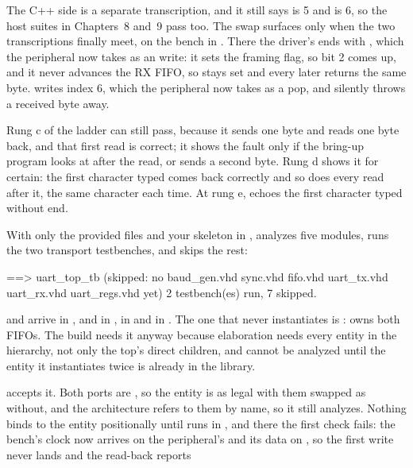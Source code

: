 The C++ side is a separate transcription, and it still says  is 5 and
 is 6, so the host suites in Chapters~8 and~9 pass too. The swap surfaces only
when the two transcriptions finally meet, on the bench in . There the driver's
 ends with , which the peripheral now takes as an
 write: it sets the framing flag, so  bit 2 comes up, and it never
advances the RX FIFO, so  stays set and every later  returns the same
byte.  writes index 6, which the peripheral now takes as a pop, and silently
throws a received byte away.

Rung c of the ladder can still pass, because it sends one byte and reads one byte back, and that
first read is correct; it shows the fault only if the bring-up program looks at  after
the read, or sends a second byte. Rung d shows it for certain: the first character typed comes back
correctly and so does every read after it, the same character each time. At rung e,
 echoes the first character typed without end.

 With only the provided files and your skeleton in ,  analyzes
five modules, runs the two transport testbenches, and skips the rest:

\begin{console}
==> uart_top_tb (skipped: no baud_gen.vhd sync.vhd fifo.vhd uart_tx.vhd uart_rx.vhd uart_regs.vhd yet)
2 testbench(es) run, 7 skipped.
\end{console}

\noindent {} and  arrive in ,  and  in
,  in  and  in . The one that
 never instantiates is :  owns both FIFOs. The build needs
it anyway because elaboration needs every entity in the hierarchy, not only the top's direct
children, and  cannot be analyzed until the entity it instantiates twice is already
in the  library.

  accepts it. Both ports are , so the entity is as legal
with them swapped as without, and the architecture refers to them by name, so it still analyzes.
Nothing binds to the entity positionally until  runs in , and there
the first check fails: the bench's clock now arrives on the peripheral's  and its data on
, so the first write never lands and the read-back reports

